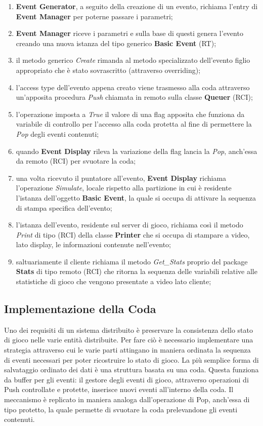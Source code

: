 \documentclass[aps,letterpaper,10pt]{article}
\begin{document}
\begin{enumerate}
	\item \textbf{Event Generator}, a seguito della creazione di un evento, richiama l'entry di \textbf{Event Manager} per poterne passare i parametri;
	\item \textbf{Event Manager} riceve i parametri e sulla base di questi genera l'evento creando una nuova istanza del tipo generico \textbf{Basic Event} (RT);
	\item il metodo generico \emph{Create} rimanda al metodo specializzato dell'evento figlio appropriato che \`e stato sovrascritto (attraverso overriding);
	\item l'access type dell'evento appena creato viene trasmesso alla coda attraverso un'apposita procedura \emph{Push} chiamata in remoto sulla classe \textbf{Queuer} (RCI);
	\item l'operazione imposta a \emph{True} il valore di una flag apposita che funziona da variabile di controllo per l'accesso alla coda protetta al fine di permettere la \emph{Pop} degli eventi contenuti;
	\item quando \textbf{Event Display} rileva la variazione della flag lancia la \emph{Pop}, anch'essa da remoto (RCI) per svuotare la coda;
	\item una volta ricevuto il puntatore all'evento, \textbf{Event Display} richiama l'operazione \emph{Simulate}, locale rispetto alla partizione in cui \`e residente l'istanza dell'oggetto \textbf{Basic Event}, la quale si occupa di attivare la sequenza di stampa specifica dell'evento;
	\item l'istanza dell'evento, residente sul server di gioco, richiama cos\`i il metodo \emph{Print} di tipo (RCI) della classe \textbf{Printer} che si occupa di stampare a video, lato display, le informazioni contenute nell'evento;
	\item saltuariamente il cliente richiama il metodo \emph{Get\_Stats} proprio del package \textbf{Stats} di tipo remoto (RCI) che ritorna la sequenza delle variabili relative alle statistiche di gioco che vengono presentate a video lato cliente;
\end{enumerate}

\subsection{Implementazione della Coda}

Uno dei requisiti di un sistema distribuito \`e preservare la consistenza dello stato di gioco nelle varie entit\`a distribuite. Per fare ci\`o \`e necessario implementare una strategia attraverso cui le varie parti attingano in maniera ordinata la sequenza di eventi necessari per poter ricostruire lo stato di gioco. La pi\`u semplice forma di salvataggio ordinato dei dati \`e una struttura basata su una coda. Questa funziona da buffer per gli eventi: il gestore degli eventi di gioco, attraverso operazioni di Push controllate e protette, inserisce nuovi eventi all'interno della coda. Il meccanismo \`e replicato in maniera analoga dall'operazione di Pop, anch'essa di tipo protetto, la quale permette di svuotare la coda prelevandone gli eventi contenuti. \vspace{3mm}
\end{document}
